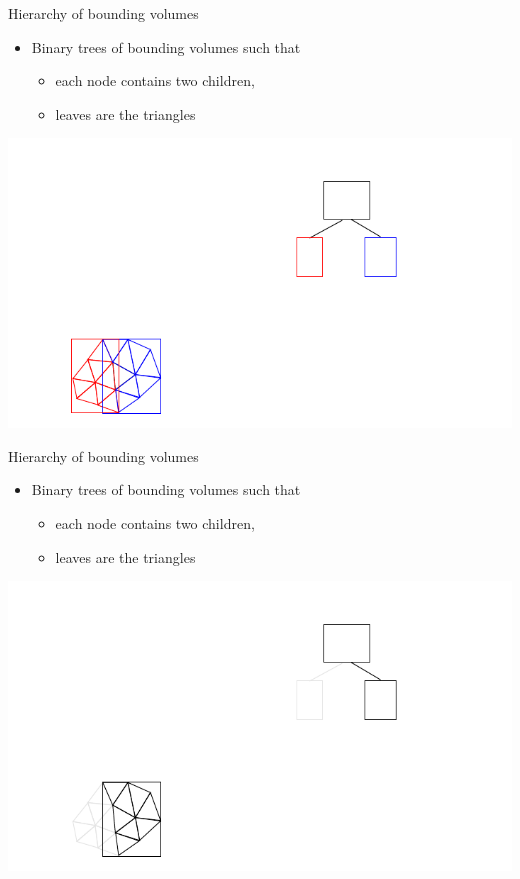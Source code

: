\begin{frame} {Hierarchy of bounding volumes}
  \begin{itemize}
  \item Binary trees of bounding volumes such that
    \begin{itemize}
    \item each node contains two children,
    \item leaves are the triangles
    \end{itemize}
  \end{itemize}
  \centerline {
    \includegraphics[width=.8\linewidth]{figures/bvh4.pdf}
  }
\end{frame}

\begin{frame} {Hierarchy of bounding volumes}
  \begin{itemize}
  \item Binary trees of bounding volumes such that
    \begin{itemize}
    \item each node contains two children,
    \item leaves are the triangles
    \end{itemize}
  \end{itemize}
  \centerline {
    \includegraphics[width=.8\linewidth]{figures/bvh5.pdf}
  }
\end{frame}

